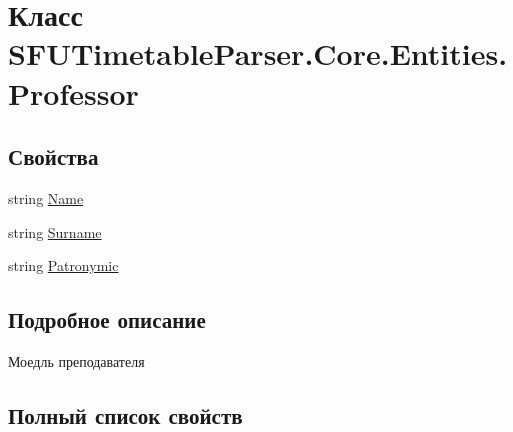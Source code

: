 \hypertarget{class_s_f_u_timetable_parser_1_1_core_1_1_entities_1_1_professor}{}\section{Класс S\+F\+U\+Timetable\+Parser.\+Core.\+Entities.\+Professor}
\label{class_s_f_u_timetable_parser_1_1_core_1_1_entities_1_1_professor}
\subsection*{Свойства}
\begin{DoxyCompactItemize}
\item 
string \hyperlink{class_s_f_u_timetable_parser_1_1_core_1_1_entities_1_1_professor_aef0a660b8ec7c3fe098fd05f1c150849}{Name}
\item 
string \hyperlink{class_s_f_u_timetable_parser_1_1_core_1_1_entities_1_1_professor_af12c8b78e929132a07b6ecbb47459978}{Surname}
\item 
string \hyperlink{class_s_f_u_timetable_parser_1_1_core_1_1_entities_1_1_professor_a0b10ef5eb622879e43685d3b0794fb18}{Patronymic}
\end{DoxyCompactItemize}


\subsection{Подробное описание}
Моедль преподавателя 

\subsection{Полный список свойств}
\mbox{\label{class_s_f_u_timetable_parser_1_1_core_1_1_entities_1_1_professor_aef0a660b8ec7c3fe098fd05f1c150849}} 
